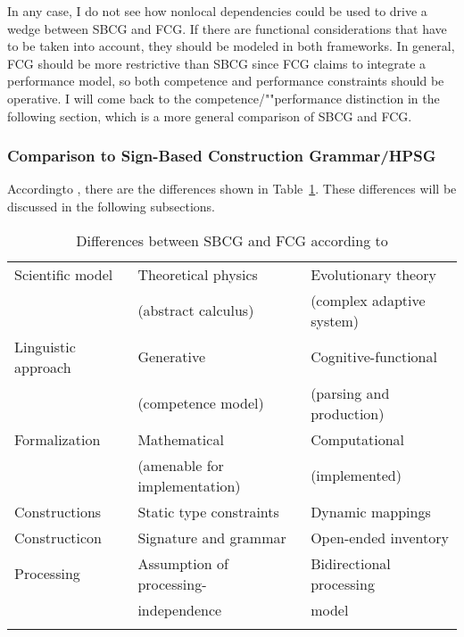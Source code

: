 In any case, I do not see how nonlocal dependencies could be used to drive a wedge between SBCG and
FCG. If there are functional considerations that have to be taken into account, they should be
modeled in both frameworks. In general, FCG should be more restrictive than SBCG since FCG claims to
integrate a performance model, so both competence and performance constraints should be operative. I
will come back to the competence/""performance distinction in the following section, which is a more
general comparison of SBCG and FCG.

\subsubsection{Comparison to Sign-Based Construction Grammar/HPSG}

\largerpage
According\indexhpsgstart\indexsbcgstart to \citet{vanTrijp2013a}, there are the differences shown in Table~\ref{table-differences-SBCG-FCG}.
%
These differences will be discussed in the following subsections.
\begin{table}
\caption{\label{table-differences-SBCG-FCG}Differences between SBCG and FCG according to \citet[]{vanTrijp2013a}}
\begin{tabular}{@{}lll@{}}\lsptoprule
Scientific model    & Theoretical physics           & Evolutionary theory\\
                    & (abstract calculus)           &  (complex adaptive system)\\[4pt]
Linguistic approach & Generative                    & Cognitive-functional\\
                    & (competence model)            & (parsing and production)\\[4pt]
Formalization       & Mathematical                  & Computational\\ 
                    & (amenable for implementation) & (implemented)\\[4pt]
Constructions       & Static type constraints       & Dynamic mappings\\[4pt]
Constructicon       & Signature and grammar         & Open-ended inventory\\[4pt]
Processing          & Assumption of processing-     & Bidirectional processing\\
                    & independence                  & model\\\lspbottomrule
\end{tabular}
\end{table}%

